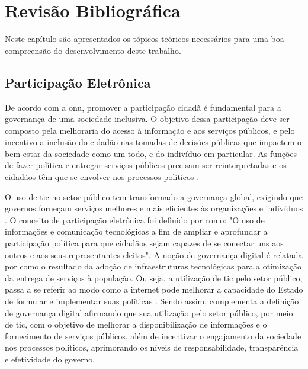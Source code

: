 \chapter[Revisão Bibliográfica]{Revisão Bibliográfica} 
\label{cap:cap2}

Neste capítulo são apresentados os tópicos teóricos necessários para uma boa compreensão do desenvolvimento deste trabalho.

\section{Participação Eletrônica}
\label{sec:e-part}
De acordo com a \acrshort{onu}, promover a participação cidadã é fundamental para a governança de uma sociedade inclusiva.
O objetivo dessa participação deve ser composto pela melhoraria do acesso à informação e aos serviços públicos,
e pelo incentivo a inclusão do cidadão nas tomadas de decisões públicas que impactem o bem estar da sociedade como um todo, e do indivíduo em particular. 
As funções de fazer política e entregar serviços públicos precisam ser reinterpretadas e os cidadãos têm que se envolver nos processos políticos \cite{bovaird2007beyond}.

\par
O uso de \acrfull{tic} no setor público tem transformado a governança global, exigindo que governos forneçam
serviços melhores e mais eficientes às organizações e indivíduos \cite{afdb2014uneca}. O conceito de participação eletrônica foi definido por  como:
"O uso de informações e comunicação tecnológicas a fim de ampliar e aprofundar a participação política para que cidadãos sejam capazes de se conectar 
uns aos outros e aos seus representantes eleitos".
A noção de governança digital é relatada por  como o resultado da adoção de infraestruturas tecnológicas para a otimização da entrega de serviços à população.
Ou seja, a utilização de \acrshort{tic} pelo setor público, passa a se referir ao modo como a internet pode melhorar a capacidade do Estado de formular
e implementar suas políticas \cite{parra2017governancca}. Sendo assim,  complementa a definição de governança digital afirmando que sua utilização
pelo setor público, por meio de \acrshort{tic}, com o objetivo de melhorar a disponibilização de informações e o fornecimento de serviços públicos, além de incentivar o engajamento
da sociedade nos processos políticos, aprimorando os níveis de responsabilidade, transparência e efetividade do governo.

